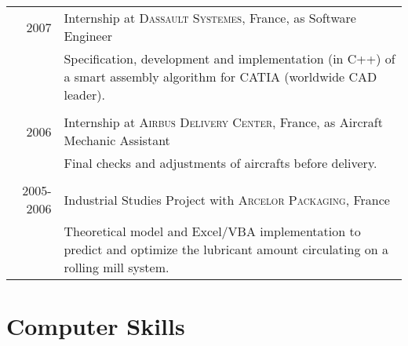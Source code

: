 \documentclass[a4paper,10pt]{article} %
\begin{document}
\begin{tabular}{r|p{11.5cm}}

\textsc{2007} &
Internship at \textsc{Dassault Systemes}, France, as Software Engineer \\
& \footnotesize{Specification, development and implementation (in C++) of a
  smart assembly algorithm for CATIA (worldwide CAD leader).} \\
\multicolumn{2}{c}{} \\


\textsc{2006} &
Internship at \textsc{Airbus Delivery Center}, France,
 as Aircraft Mechanic Assistant \\
& \footnotesize{Final checks and adjustments of aircrafts before delivery.} \\
\multicolumn{2}{c}{} \\


\textsc{2005-2006} &
Industrial Studies Project with \textsc{Arcelor
Packaging}, France \\
& \footnotesize{Theoretical model and Excel/VBA implementation to
  predict and optimize the lubricant amount circulating on a rolling
  mill system.} \\


\end{tabular}


\section{Computer Skills}
\end{document}
